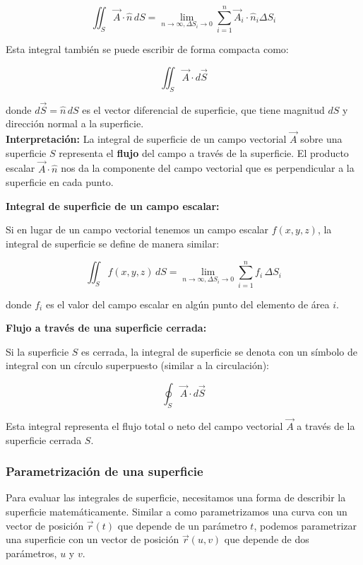 \documentclass{article}
\begin{document}
\[
\iint_S \vec{A} \cdot \hat{n} \, dS = \lim_{n \to \infty, \Delta S_i \to 0} \sum_{i=1}^n \vec{A}_i \cdot \hat{n}_i \Delta S_i
\]

Esta integral también se puede escribir de forma compacta como:

\[
\iint_S \vec{A} \cdot d\vec{S}
\]

donde $d\vec{S} = \hat{n} \, dS$ es el vector diferencial de superficie, que tiene magnitud $dS$ y dirección normal a la superficie.\\

\textbf{Interpretación:} La integral de superficie de un campo vectorial $\vec{A}$ sobre una superficie $S$ representa el \textbf{flujo} del campo a través de la superficie. El producto escalar $\vec{A} \cdot \hat{n}$ nos da la componente del campo vectorial que es perpendicular a la superficie en cada punto.

\textbf{Integral de superficie de un campo escalar:}

Si en lugar de un campo vectorial tenemos un campo escalar $f(x,y,z)$, la integral de superficie se define de manera similar:

\[
\iint_S f(x, y, z) \, dS = \lim_{n \to \infty, \Delta S_i \to 0} \sum_{i=1}^n f_i \, \Delta S_i
\]

donde $f_i$ es el valor del campo escalar en algún punto del elemento de área $i$.

\textbf{Flujo a través de una superficie cerrada:}

Si la superficie $S$ es cerrada, la integral de superficie se denota con un símbolo de integral con un círculo superpuesto (similar a la circulación):

\[
\oint_S \vec{A} \cdot d\vec{S}
\]

Esta integral representa el flujo total o neto del campo vectorial $\vec{A}$ a través de la superficie cerrada $S$.

\subsubsection{Parametrización de una superficie}

Para evaluar las integrales de superficie, necesitamos una forma de describir la superficie matemáticamente. Similar a como parametrizamos una curva con un vector de posición $\vec{r}(t)$ que depende de un parámetro $t$, podemos parametrizar una superficie con un vector de posición $\vec{r}(u,v)$ que depende de dos parámetros, $u$ y $v$.
\end{document}

